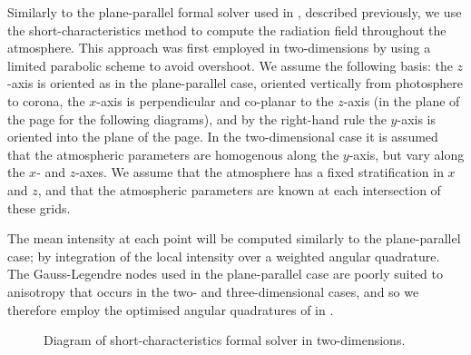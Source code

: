 Similarly to the plane-parallel formal solver used in \Lw{}, described previously, we use the short-characteristics method to compute the radiation field throughout the atmosphere.
This approach was first employed in two-dimensions by \citet{Auer1994} using a limited parabolic scheme to avoid overshoot.
We assume the following basis: the $z$-axis is oriented as in the plane-parallel case, oriented vertically from photosphere to corona, the $x$-axis is perpendicular and co-planar to the $z$-axis (in the plane of the page for the following diagrams), and by the right-hand rule the $y$-axis is oriented into the plane of the page.
In the two-dimensional case it is assumed that the atmospheric parameters are homogenous along the $y$-axis, but vary along the $x$- and $z$-axes.
We assume that the atmosphere has a fixed stratification in $x$ and $z$, and that the atmospheric parameters are known at each intersection of these grids.

The mean intensity at each point will be computed similarly to the plane-parallel case; by integration of the local intensity over a weighted angular quadrature.
The Gauss-Legendre nodes used in the plane-parallel case are poorly suited to anisotropy that occurs in the two- and three-dimensional cases, and so we therefore employ the optimised angular quadratures of \citet{Stepan2020} in \Lw{}.

\begin{figure}
\centering
{}
\caption{Diagram of short-characteristics formal solver in two-dimensions.}
\label{Fig:Sc2d}
\end{figure}


